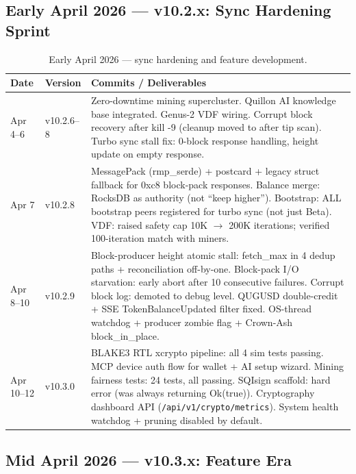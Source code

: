 \documentclass[12pt,a4paper]{article}
\begin{document}
\subsection*{Early April 2026 — v10.2.x: Sync Hardening Sprint}

\begin{table}[H]
\centering
\small
\renewcommand{\arraystretch}{1.28}
\begin{tabularx}{\linewidth}{@{}l l X@{}}
\toprule
\textbf{Date} & \textbf{Version} & \textbf{Commits / Deliverables} \\
\midrule
Apr 4--6 & v10.2.6--8 &
  Zero-downtime mining supercluster.
  Quillon AI knowledge base integrated.
  Genus-2 VDF wiring.
  Corrupt block recovery after kill -9 (cleanup moved to after tip scan).
  Turbo sync stall fix: 0-block response handling, height update on empty response. \\
\rowcolor{qblue!10}
Apr 7 & v10.2.8 &
  MessagePack (rmp\_serde) + postcard + legacy struct fallback for 0xc8 block-pack responses.
  Balance merge: RocksDB as authority (not ``keep higher'').
  Bootstrap: ALL bootstrap peers registered for turbo sync (not just Beta).
  VDF: raised safety cap 10K $\to$ 200K iterations; verified 100-iteration match with miners. \\
Apr 8--10 & v10.2.9 &
  Block-producer height atomic stall: fetch\_max in 4 dedup paths + reconciliation off-by-one.
  Block-pack I/O starvation: early abort after 10 consecutive failures.
  Corrupt block log: demoted to debug level.
  QUGUSD double-credit + SSE TokenBalanceUpdated filter fixed.
  OS-thread watchdog + producer zombie flag + Crown-Ash block\_in\_place. \\
\rowcolor{qblue!10}
Apr 10--12 & v10.3.0 &
  BLAKE3 RTL xcrypto pipeline: all 4 sim tests passing.
  MCP device auth flow for wallet + AI setup wizard.
  Mining fairness tests: 24 tests, all passing.
  SQIsign scaffold: hard error (was always returning Ok(true)).
  Cryptography dashboard API (\texttt{/api/v1/crypto/metrics}).
  System health watchdog + pruning disabled by default. \\
\bottomrule
\end{tabularx}
\caption{Early April 2026 — sync hardening and feature development.}
\end{table}

\subsection*{Mid April 2026 — v10.3.x: Feature Era}
\end{document}
